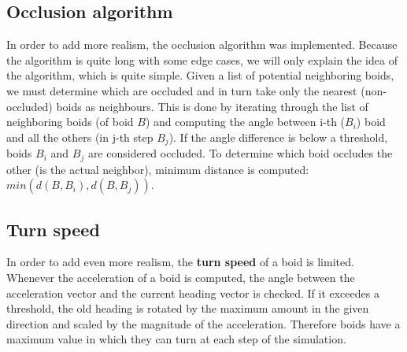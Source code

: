 \documentclass[9pt]{pnas-new}
\begin{document}
\subsection*{Occlusion algorithm}

In order to add more realism, the occlusion algorithm was implemented.
Because the algorithm is quite long with some edge cases, we will only explain the idea of the algorithm, which is quite simple.
Given a list of potential neighboring boids, we must determine which are occluded and in turn take only the nearest (non-occluded) boids as neighbours.
This is done by iterating through the list of neighboring boids (of boid $B$) and computing the angle between i-th ($B_i$) boid and all the others (in j-th step $B_j$).
If the angle difference is below a threshold, boids $B_i$ and $B_j$ are considered occluded.
To determine which boid occludes the other (is the actual neighbor), minimum distance is computed: $ min(d(B, B_i), d(B, B_j)) $.

\begin{center}
\end{center}

\subsection*{Turn speed}

In order to add even more realism, the \textbf{turn speed} of a boid is limited.
Whenever the acceleration of a boid is computed, the angle between the acceleration vector and the current heading vector is checked.
If it exceedes a threshold, the old heading is rotated by the maximum amount in the given direction and scaled by the magnitude of the acceleration.
Therefore boids have a maximum value in which they can turn at each step of the simulation.
\end{document}
